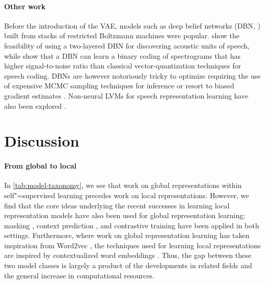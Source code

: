 {\paragraph{Other work}
Before the introduction of the VAE, models such as deep belief networks (DBN, \citealp{hinton_fast_2006}) built from stacks of restricted Boltzmann machines \parencite{smolensky_chapter_1986,fischer_training_2014} were popular. \textcite{lee_unsupervised_2009} show the feasibility of using a two-layered DBN for discovering acoustic units of speech, while \textcite{deng_binary_2010} show that a DBN can learn a binary coding of spectrograms that has higher signal-to-noise ratio than classical vector-quantization techniques for speech coding.
DBNs are however notoriously tricky to optimize requiring the use of expensive MCMC sampling techniques for inference or resort to biased gradient estimates \parencite{montavon_practical_2012,fischer_bounding_2011}.
Non-neural LVMs for speech representation learning have also been explored
\parencite{lee_nonparametric_2012, ondel_variational_2016, heck_feature_2017, jansen_weak_2013}.


\section{Discussion}
\label{paper_brief_sec: discussion}

\paragraph{From global to local} 
In \cref{tab:model-taxonomy}, we see that work on global representations within self"=supervised learning precedes work on local representations. However, we find that the core ideas underlying the recent successes in learning local representation models have also been used for global representation learning; masking \parencite{chung_audio_2016}, context prediction \parencite{chung_speech2vec_2018}, and contrastive training \parencite{milde_unspeech_2018} have been applied in both settings. Furthermore, where work on global representation learning has taken inspiration from Word2vec \parencite{mikolov_distributed_2013}, the techniques used for learning local representations are inspired by contextualized word embeddings \parencite{devlin_bert_2018}. Thus, the gap between these two model classes is largely a product of the developments in related fields and the general increase in computational resources.

}
